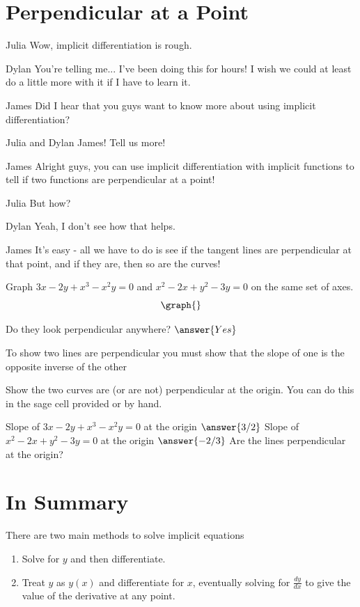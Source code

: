 \documentclass{ximera}
\begin{document}
\section{Perpendicular at a Point}
\begin{dialogue}
\item[Julia] Wow, implicit differentiation is rough.
\item[Dylan] You're telling me... I've been doing this for hours! I wish we could at least do a little more with it if I have to learn it.
\item[James] Did I hear that you guys want to know more about using implicit differentiation?
\item[Julia and Dylan] James! Tell us more!
\item[James] Alright guys, you can use implicit differentiation with implicit functions to tell if two functions are perpendicular at a point!
\item[Julia] But how?
\item[Dylan] Yeah, I don't see how that helps.
\item[James] It's easy - all we have to do is see if the tangent lines are perpendicular at that point, and if they are, then so are the curves!
\end{dialogue}
\begin{question}
Graph $3x - 2y + x^3-x^2y = 0$ and $x^2 - 2x + y^2 - 3y = 0$ on the same set of axes.
\[
\graph{}
\]

Do they look perpendicular anywhere?
$\answer{Yes}$
\end{question}
\begin{question}
\begin{hint}
To show two lines are perpendicular you must show that the slope of one is the opposite inverse of the other
\end{hint}
Show the two curves are (or are not) perpendicular at the origin. You can do this in the sage cell provided or by hand.
\begin{onlineOnly}
\begin{sageCell}

\end{sageCell}
\end{onlineOnly}
Slope of $3x - 2y + x^3-x^2y = 0$ at the origin $\answer{3/2}$
Slope of $x^2 - 2x + y^2 - 3y = 0$ at the origin $\answer{-2/3}$
Are the lines perpendicular at the origin?



\end{question}
\section{In Summary}
There are two main methods to solve implicit equations
\begin{enumerate}
\item{Solve for $y$ and then differentiate.}
\item{Treat $y$ as $y(x)$ and differentiate for $x$, eventually solving for $\frac{dy}{dx}$ to give the value of the derivative at any point.}
\end{enumerate}
\pagebreak
\end{document}
